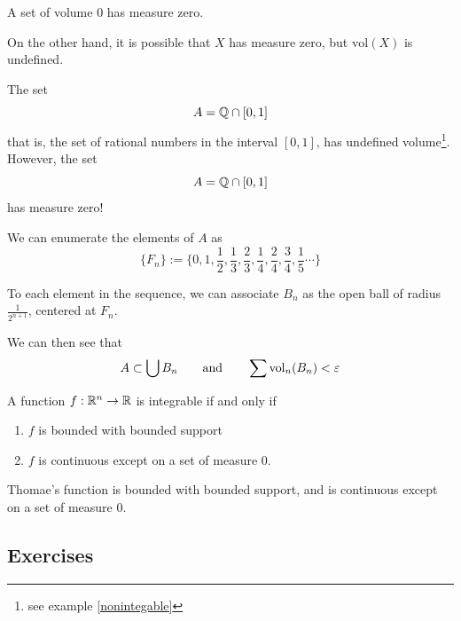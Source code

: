 \begin{proposition}
    A set of volume $0$ has measure zero.
    \end{proposition}

    \begin{remark}
    On the other hand, it is possible that $X$ has measure zero, but $\text{vol}(X)$ is undefined.
    \end{remark}

\begin{example}
        The set $$A = \mathbb{Q} \cap [0,1]$$ that is, the set of rational numbers in the interval $[0,1]$, has undefined volume\footnote{see example \ref{nonintegable}}.  However, the set $$A = \mathbb{Q} \cap [0,1]$$ has measure zero!

        We can enumerate the elements of $A$ as $$\{F_n\} := \{0,1, \frac{1}{2}, \frac{1}{3}, \frac{2}{3}, \frac{1}{4}, \frac{2}{4}, \frac{3}{4}, \frac{1}{5} \cdots \}$$

        To each element in the sequence, we can associate $B_n$ as the open ball of radius $\frac{1}{2^{n+1}}$, centered at $F_n$.

        We can then see that $$A \subset \bigcup B_n \qquad \textnormal{and} \qquad \sum \text{vol}_n(B_n) < \varepsilon$$
    \end{example}

\begin{theorem}\label{integrabilityIII}
    A function $f: \mathbb{R}^n \to \mathbb{R}$ is integrable if and only if
    \begin{enumerate}
        \item $f$ is bounded with bounded support
        \item $f$ is continuous except on a set of measure 0.
    \end{enumerate}
    \end{theorem}

    \begin{example}
        Thomae's function is bounded with bounded support, and is continuous except on a set of measure 0.
    \end{example}
    











\subsection{Exercises}

